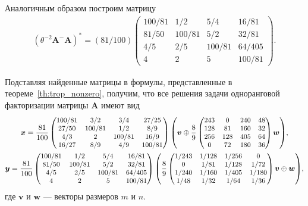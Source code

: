 \documentclass[specialist,
               substylefile = spbu.rtx,
               subf,href,colorlinks=true, 12pt]{disser}
\theoremstyle{definition}
\begin{document}
Аналогичным образом построим матрицу
\begin{gather*}
(\theta^{-2}\bm{A}^{-}\bm{A})^{\ast}
=
(81/100)
\begin{pmatrix}
100/81 &1/2 &5/4 &16/81\\
81/50 &100/81 &5/2 &32/81\\
4/5 &2/5 &100/81 &64/405\\
4 &2 &5 &100/81
\end{pmatrix}.%
\end{gather*}

Подставляя найденные матрицы в формулы, представленные в теореме~\ref{th:trop_nonzero}, получим, что все решения задачи одноранговой факторизации матрицы $\bm{A}$ имеют вид
\begin{gather*}
\bm{x}
=
\small{
\frac{81}{100}
\begin{pmatrix}
100/81 & 3/2 &3/4 &27/25\\
27/50 &100/81 &1/2 &8/9\\
4/3 &2 &100/81 &16/9\\
16/27 &8/9 &4/9 &100/81
\end{pmatrix}
\left(
\bm{v}
\oplus
\frac{8}{9}
\begin{pmatrix}
243 &0 &240 &48\\
128 &81 &160 &32\\
256 &128 &405 &64\\
0 &72 &180 &36
\end{pmatrix}
\bm{w}
\right)
},
\\
\bm{y}
=
\small{
\frac{81}{100}
\begin{pmatrix}
100/81 &1/2 &5/4 &16/81\\
81/50 &100/81 &5/2 &32/81\\
4/5 &2/5 &100/81 &64/405\\
4 &2 &5 &100/81
\end{pmatrix}
\left(
\frac{8}{9}
\begin{pmatrix}
1/243 &1/128 &1/256 &0\\
0 &1/81 &1/128 &1/72\\
1/240 &1/160 &1/405 &1/180\\
1/48 &1/32 &1/64 &1/36
\end{pmatrix}
\bm{v}
\oplus
\bm{w}
\right)
},
\end{gather*}
где $\bm{v}$ и $\bm{w}$ --- векторы размеров $m$ и $n$.
\end{document}
